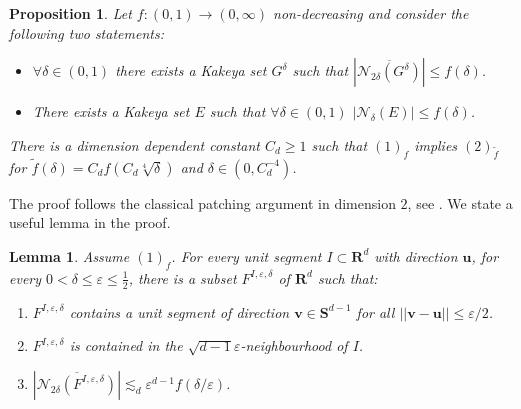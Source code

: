 \documentclass[10pt]{amsart}
\newcommand{\R}{\mathbf{R}}
\newtheorem{lemma}[theorem]{Lemma}
\newtheorem{proposition}[theorem]{Proposition}
\begin{document}
\begin{proposition}\label{prop: prop kakeya} Let $f:(0,1)\rightarrow (0,\infty)$ non-decreasing and consider the following two statements:
\begin{itemize}
    \item[$(1)_f$] $\forall \delta\in (0,1)$ there exists a Kakeya set $G^\delta$ such that $|\overline{\mathcal{N}_{2\delta}(G^\delta)}|\leq f(\delta)$.
    \item[$(2)_f$] There exists a Kakeya set $E$ such that $\forall \delta\in (0,1)$ $|\mathcal{N}_\delta(E)|\leq f(\delta)$.
\end{itemize}
There is a dimension dependent constant $C_d\geq 1$ such that $(1)_f$ implies $(2)_{\widetilde{f}}$ for $\widetilde{f}(\delta)=C_d f(C_d\sqrt[4]{\delta})$ and $\delta\in (0,C_d^{-4})$.
\end{proposition}
The proof follows the classical patching argument in dimension $2$, see \cite{RefWorks:wolff2003recent,RefWorks:keich1999lp}. We state a useful lemma in the proof.
\begin{lemma}\label{lem:local_kakeya} Assume $(1)_f$. For every unit segment $I\subset \R^d$ with direction $\mathbf{u}$, for every $0<\delta \leq \varepsilon \leq \frac 1 2$, there is a subset $F^{I,\varepsilon,\delta}$ of $\R^d$ such that:
\begin{enumerate}
    \item $F^{I,\varepsilon,\delta}$ contains a unit segment of direction $\mathbf{v}\in \mathbf{S}^{d-1}$ for all $||\mathbf{v}-\mathbf{u}||\leq \varepsilon/2$.
    \item $F^{I,\varepsilon,\delta}$ is contained in the $\sqrt{d-1} \varepsilon$-neighbourhood of $I$.
    \item $ |\overline{\mathcal{N}_{2\delta}(F^{I,\varepsilon,\delta})}|\lesssim_d \varepsilon^{d-1}f(\delta/\varepsilon)$.
\end{enumerate} 
\end{lemma} 
\end{document}
